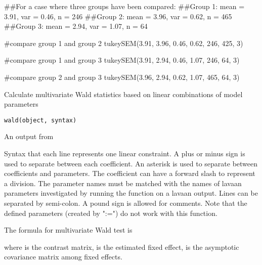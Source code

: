 \documentclass[a4paper]{book}
\begin{document}
%
\begin{Examples}
\begin{ExampleCode}
##For a case where three groups have been compared:
##Group 1: mean = 3.91, var = 0.46, n = 246
##Group 2: mean = 3.96, var = 0.62, n = 465
##Group 3: mean = 2.94, var = 1.07, n = 64

#compare group 1 and group 2
tukeySEM(3.91, 3.96, 0.46, 0.62, 246, 425, 3)

#compare group 1 and group 3
tukeySEM(3.91, 2.94, 0.46, 1.07, 246, 64, 3)

#compare group 2 and group 3
tukeySEM(3.96, 2.94, 0.62, 1.07, 465, 64, 3)
\end{ExampleCode}
\end{Examples}
%
\begin{Description}\relax
Calculate multivariate Wald statistics based on linear combinations of model parameters
\end{Description}
%
\begin{Usage}
\begin{verbatim}
wald(object, syntax)
\end{verbatim}
\end{Usage}
%
\begin{Arguments}
\begin{ldescription}
\item[\code{object}] An output from 
\item[\code{syntax}] Syntax that each line represents one linear constraint. A plus or minus sign is used to separate between each coefficient. An asterisk is used to separate between coefficients and parameters. The coefficient can have a forward slash to represent a division. The parameter names must be matched with the names of lavaan parameters investigated by running the  function on a lavaan output. Lines can be separated by semi-colon. A pound sign is allowed for comments. Note that the defined parameters (created by ":=") do not work with this function.
\end{ldescription}
\end{Arguments}
%
\begin{Details}\relax
The formula for multivariate Wald test is


where  is the contrast matrix,  is the estimated fixed effect,  is the asymptotic covariance matrix among fixed effects. 
\end{Details}
\end{document}
